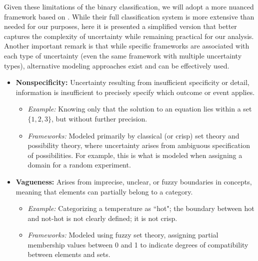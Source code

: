 Given these limitations of the binary classification, we will adopt a more nuanced framework based on \cite{UncertaintySciences}. While their full classification system is more extensive than needed for our purposes, here it is presented a simplified version that better captures the complexity of uncertainty while remaining practical for our analysis. Another important remark is that while specific frameworks are associated with each type of uncertainty (even the same framework with multiple uncertainty types), alternative modeling approaches exist and can be effectively used.


\begin{itemize}
    \item \textbf{Nonspecificity:} Uncertainty resulting from insufficient specificity or detail, information is insufficient to precisely specify which outcome or event applies. 
    \begin{itemize}
        \item \textit{Example:} Knowing only that the solution to an equation lies within a set \(\{1, 2, 3\}\), but without further precision.
        \item \textit{Frameworks:} Modeled primarily by classical (or crisp) set theory and possibility theory, where uncertainty arises from ambiguous specification of possibilities. For example, this is what is modeled when assigning a domain for a random experiment.
    \end{itemize}

    \item \textbf{Vagueness:} Arises from imprecise, unclear, or fuzzy boundaries in concepts, meaning that elements can partially belong to a category. 
    \begin{itemize}
        \item \textit{Example:} Categorizing a temperature as ``hot"; the boundary between hot and not-hot is not clearly defined; it is not crisp.
        \item \textit{Frameworks:} Modeled using fuzzy set theory, assigning partial membership values between 0 and 1 to indicate degrees of compatibility between elements and sets.
    \end{itemize}


\end{itemize}

